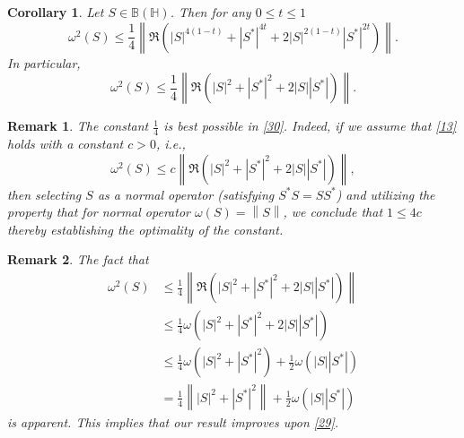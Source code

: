 \documentclass[12pt,twoside,reqno]{amsart}
\newtheorem{remark}{Remark}[section]
\newtheorem{corollary}{Corollary}[section]
\numberwithin{equation}{section}
\begin{document}
\begin{corollary}
Let $S\in \mathbb B\left( \mathbb H \right)$. Then for any $0 \le t \le 1$
\[{{\omega }^{2}}\left( S \right)\le \frac{1}{4}\left\| \Re\left( {{\left| S \right|}^{4\left( 1-t \right)}}+{{\left| {{S}^{*}} \right|}^{4t}}+2{{\left| S \right|}^{2\left( 1-t \right)}}{{\left| {{S}^{*}} \right|}^{2t}} \right) \right\|.\]	
In particular,
\begin{equation}\label{30}
{{\omega }^{2}}\left( S \right)\le \frac{1}{4}\left\| \Re\left( {{\left| S \right|}^{2}}+{{\left| {{S}^{*}} \right|}^{2}}+2\left| S \right|\left| {{S}^{*}} \right| \right) \right\|.
\end{equation}
\end{corollary}

\begin{remark}\label{15}
The constant $\frac{1}{4}$ is best possible in \eqref{30}. Indeed, if we assume that \eqref{13} holds with a constant $c>0$, i.e.,
\[{{\omega }^{2}}\left( S \right)\le c\left\| \Re\left( {{\left| S \right|}^{2}}+{{\left| {{S}^{*}} \right|}^{2}}+2\left| S \right|\left| {{S}^{*}} \right| \right) \right\|,\]
 then selecting $S$ as a normal operator (satisfying ${{S}^{*}}S=S{{S}^{*}}$) and utilizing the property that for normal operator $\omega \left( S \right)=\left\| S \right\|$, we conclude that $1\le 4c$ thereby establishing the optimality of the constant.
\end{remark}

\begin{remark}
The fact that
\[\begin{aligned}
   {{\omega }^{2}}\left( S \right)&\le \frac{1}{4}\left\| \Re\left( {{\left| S \right|}^{2}}+{{\left| {{S}^{*}} \right|}^{2}}+2\left| S \right|\left| {{S}^{*}} \right| \right) \right\| \\ 
 & \le \frac{1}{4}\omega \left( {{\left| S \right|}^{2}}+{{\left| {{S}^{*}} \right|}^{2}}+2\left| S \right|\left| {{S}^{*}} \right| \right) \\ 
 & \le \frac{1}{4}\omega \left( {{\left| S \right|}^{2}}+{{\left| {{S}^{*}} \right|}^{2}} \right)+\frac{1}{2}\omega \left( \left| S \right|\left| {{S}^{*}} \right| \right) \\ 
 & =\frac{1}{4}\left\| {{\left| S \right|}^{2}}+{{\left| {{S}^{*}} \right|}^{2}} \right\|+\frac{1}{2}\omega \left( \left| S \right|\left| {{S}^{*}} \right| \right)  
\end{aligned}\]
is apparent. This implies that our result improves upon \eqref{29}.
\end{remark}
\end{document}
